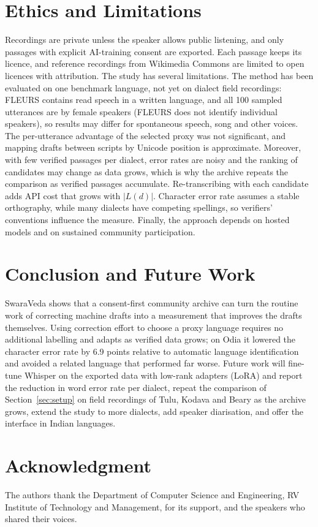 \documentclass[conference]{IEEEtran}
\begin{document}
\section{Ethics and Limitations}
Recordings are private unless the speaker allows public listening, and only passages with explicit AI-training consent are exported. Each passage keeps its licence, and reference recordings from Wikimedia Commons are limited to open licences with attribution. The study has several limitations. The method has been evaluated on one benchmark language, not yet on dialect field recordings: FLEURS contains read speech in a written language, and all 100 sampled utterances are by female speakers (FLEURS does not identify individual speakers), so results may differ for spontaneous speech, song and other voices. The per-utterance advantage of the selected proxy was not significant, and mapping drafts between scripts by Unicode position is approximate. Moreover, with few verified passages per dialect, error rates are noisy and the ranking of candidates may change as data grows, which is why the archive repeats the comparison as verified passages accumulate. Re-transcribing with each candidate adds API cost that grows with $|L(d)|$. Character error rate assumes a stable orthography, while many dialects have competing spellings, so verifiers' conventions influence the measure. Finally, the approach depends on hosted models and on sustained community participation.

\section{Conclusion and Future Work}
SwaraVeda shows that a consent-first community archive can turn the routine work of correcting machine drafts into a measurement that improves the drafts themselves. Using correction effort to choose a proxy language requires no additional labelling and adapts as verified data grows; on Odia it lowered the character error rate by 6.9 points relative to automatic language identification and avoided a related language that performed far worse. Future work will fine-tune Whisper on the exported data with low-rank adapters (LoRA) \cite{hu2022} and report the reduction in word error rate per dialect, repeat the comparison of Section~\ref{sec:setup} on field recordings of Tulu, Kodava and Beary as the archive grows, extend the study to more dialects, add speaker diarisation, and offer the interface in Indian languages.

\section*{Acknowledgment}
The authors thank the Department of Computer Science and Engineering, RV Institute of Technology and Management, for its support, and the speakers who shared their voices.
\end{document}
